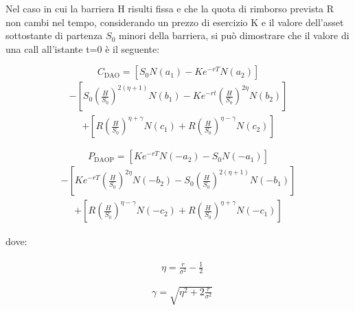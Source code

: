 \documentclass[12pt,a4paper]{report}
\begin{document}
Nel caso in cui la barriera H risulti fissa e che la quota di rimborso prevista R non cambi nel tempo, considerando un prezzo di esercizio K e il valore dell'asset sottostante di partenza $S_0$ minori della barriera, si può dimostrare che il valore di una call all'istante t=0 è il seguente:

\begin{equation}
   C_{\text{DAO}} = \left[S_0 N(a_1) - K e^{-rT} N(a_2)\right]\label{eq:barrier}
\end{equation}
\begin{align*}
       - \left[S_0 \left(\frac{H}{S_0}\right)^{2(\eta + 1)} N(b_1) - K e^{-rt} 
   \left(\frac{H}{S_0}\right)^{2\eta} N(b_2)\right] 
\end{align*}
\begin{align*}
       + \left[R \left(\frac{H}{S_0}\right)^{\eta + \gamma} N(c_1) + R \left(\frac{H}{S_0}\right)^{\eta - \gamma} N(c_2)\right]
\end{align*}

\begin{equation}
       P_{\text{DAOP}} = \left[K e^{-rT} N(-a_2) - S_0 N(-a_1)\right] \label{eq:barrier1}
\end{equation}
\begin{align*}
      - \left[K e^{-rT} \left(\frac{H}{S_0}\right)^{2\eta} N(-b_2) - S_0 \left(\frac{H}{S_0}\right)^{2(\eta + 1)} N(-b_1)\right]
\end{align*}
\begin{align*}
       + \left[R \left(\frac{H}{S_0}\right)^{\eta - \gamma} N(-c_2) + R \left(\frac{H}{S_0}\right)^{\eta + \gamma} N(-c_1)\right]
\end{align*}

dove: 

\begin{multicols}{2} %
\begin{align*}
\begin{aligned}
&\eta = \frac{r}{\sigma^2} - \frac{1}{2} 
\end{aligned}
\end{align*}
\columnbreak %
\begin{align*}
\begin{aligned}
\\
&\gamma = \sqrt{\eta^2 + 2\frac{r}{\sigma^2}} \\
\end{aligned}
\end{align*}
\end{multicols}
\end{document}
